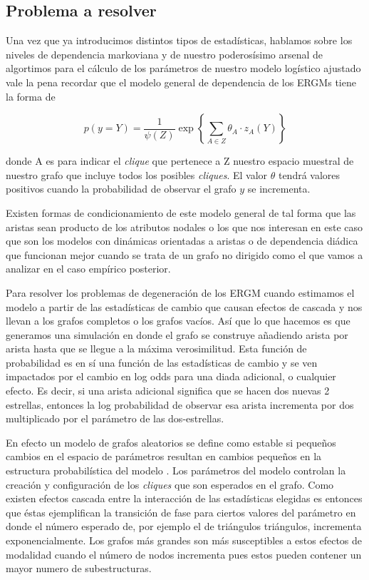 \subsection{Problema a resolver}

Una vez que ya introducimos distintos tipos de estadísticas, hablamos sobre los niveles de dependencia markoviana y de nuestro poderosísimo arsenal de algortimos para el cálculo de los parámetros de nuestro modelo logístico ajustado vale la pena recordar que el modelo general de dependencia de los ERGMs tiene la forma de

\begin{equation}
    p(y=Y)=\frac{1}{\psi(Z)} \exp \left\{\sum_{A \in Z} \theta_{A} \cdot z_{A}(Y)\right\}
\end{equation}

donde A es para indicar el \textit{clique} que pertenece a Z nuestro espacio muestral de nuestro grafo que incluye todos los posibles \textit{cliques}. El valor $\theta$ tendrá valores positivos cuando la probabilidad de observar el grafo $y$ se incrementa. 

Existen formas de condicionamiento de este modelo general de tal forma que las aristas sean producto de los atributos nodales o los que nos interesan en este caso que son los modelos con dinámicas orientadas a aristas o de dependencia diádica que funcionan mejor cuando se trata de un grafo no dirigido como el que vamos a analizar en el caso empírico posterior.

Para resolver los problemas de degeneración de los ERGM cuando estimamos el modelo a partir de las estadísticas de cambio que causan efectos de cascada y nos llevan a los grafos completos o los grafos vacíos. Así que lo que hacemos es que generamos una simulación en donde el grafo se construye añadiendo arista por arista hasta que se llegue a la máxima verosimilitud. Esta función de probabilidad es en sí una función de las estadísticas de cambio y se ven impactados por el cambio en log odds para una diada adicional, o cualquier efecto. Es decir, si una arista adicional significa que se hacen dos nuevas 2 estrellas, entonces la log probabilidad de observar esa arista incrementa por dos multiplicado por el parámetro de las dos-estrellas. 


En efecto un modelo de grafos aleatorios se define como estable si pequeños cambios en el espacio de parámetros resultan en cambios pequeños en la estructura probabilística del modelo \cite{Snidjers2010}. Los parámetros del modelo controlan la creación y configuración de los \textit{cliques} que son esperados en el grafo. Como existen efectos cascada entre la interacción de las estadísticas elegidas es entonces que éstas ejemplifican la transición de fase para ciertos valores del parámetro en donde el número esperado de, por ejemplo el de triángulos triángulos, incrementa exponencialmente. Los grafos más grandes son más susceptibles a estos efectos de modalidad cuando el número de nodos incrementa pues estos pueden contener un mayor numero de subestructuras.

